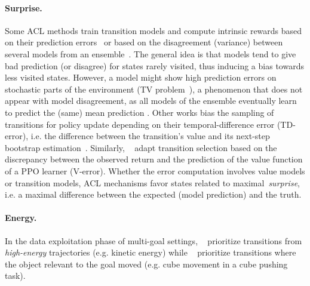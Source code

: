 \documentclass{article}
\newcommand{\mycite}[1]{\citeauthor{#1}~\shortcite{#1}}
\begin{document}
\paragraph{Surprise.} Some ACL methods train transition models and compute intrinsic rewards based on their prediction errors~\cite{icm,rnd} or based on the disagreement (variance) between several models from an ensemble~\cite{disagreement,pathakdisagreement}. The general idea is that models tend to give bad prediction (or disagree) for states rarely visited, thus inducing a bias towards less visited states. However, a model might show high prediction errors on stochastic parts of the environment (TV problem~\cite{icm}), a phenomenon that does not appear with model disagreement, as all models of the ensemble eventually learn to predict the (same) mean prediction \cite{pathakdisagreement}. 
%
Other works bias the sampling of transitions for policy update depending on their temporal-difference error (TD-error), i.e. the difference between the transition's value and its next-step bootstrap estimation~\cite{per,apex}. Similarly, \mycite{SAUNA} adapt transition selection based on the discrepancy between the observed return and the prediction of the value function of a PPO learner (V-error). Whether the error computation involves value models or transition models, ACL mechanisms favor states related to maximal~\textit{surprise}, i.e. a maximal difference between the expected (model prediction) and the truth.

\paragraph{Energy.} In the data exploitation phase of multi-goal settings, \mycite{eb-per} prioritize transitions from \textit{high-energy} trajectories (e.g. kinetic energy) while \mycite{curious} prioritize transitions where the object relevant to the goal moved (e.g. cube movement in a cube pushing task).
\end{document}
